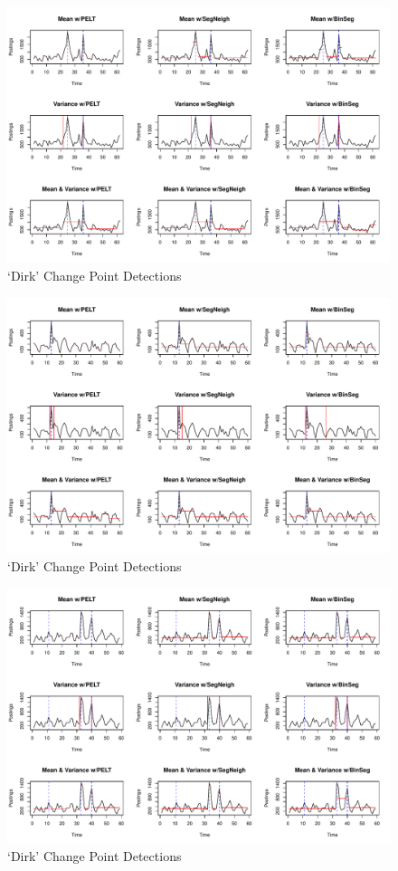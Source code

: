 \documentclass{uvamscse}	%
\begin{document}
\begin{figure}[h]
    \includegraphics[width=\textwidth]{figures/jumboresults}
    \caption{`Dirk' Change Point Detections}
    \label{fig:jumbo}
\end{figure}

\begin{figure}[h]
    \includegraphics[width=\textwidth]{figures/kvkresults}
    \caption{`Dirk' Change Point Detections}
    \label{fig:kvk}
\end{figure}

\begin{figure}[h]
    \includegraphics[width=\textwidth]{figures/rabobankresults}
    \caption{`Dirk' Change Point Detections}
    \label{fig:rabobank}
\end{figure}
\end{document}
